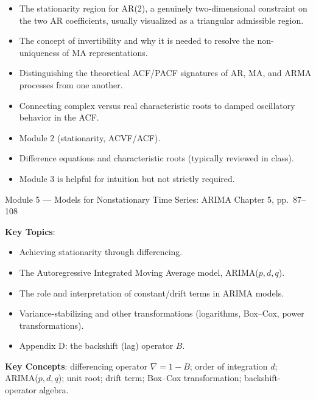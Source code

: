 \documentclass[11pt]{article}
\newcommand{\keytopics}{\textbf{\color{modblue}Key Topics}}
\newcommand{\keyconcepts}{\textbf{\color{modblue}Key Concepts}}
\begin{document}
\begin{difficult}
\begin{itemize}
  \item The stationarity region for AR(2), a genuinely two-dimensional constraint on the two AR coefficients, usually visualized as a triangular admissible region.
  \item The concept of invertibility and why it is needed to resolve the non-uniqueness of MA representations.
  \item Distinguishing the theoretical ACF/PACF signatures of AR, MA, and ARMA processes from one another.
  \item Connecting complex versus real characteristic roots to damped oscillatory behavior in the ACF.
\end{itemize}
\end{difficult}

\begin{prereqs}
\begin{itemize}
  \item Module 2 (stationarity, ACVF/ACF).
  \item Difference equations and characteristic roots (typically reviewed in class).
  \item Module 3 is helpful for intuition but not strictly required.
\end{itemize}
\end{prereqs}

\vspace{6pt}
\begin{moduletitle}{Module 5 --- Models for Nonstationary Time Series: ARIMA}
\small Chapter 5, pp.\ 87--108
\end{moduletitle}

\keytopics:
\begin{itemize}
  \item Achieving stationarity through differencing.
  \item The Autoregressive Integrated Moving Average model, ARIMA($p,d,q$).
  \item The role and interpretation of constant/drift terms in ARIMA models.
  \item Variance-stabilizing and other transformations (logarithms, Box--Cox, power transformations).
  \item Appendix D: the backshift (lag) operator $B$.
\end{itemize}

\keyconcepts: differencing operator $\nabla = 1-B$; order of integration $d$; ARIMA($p,d,q$); unit root; drift term; Box--Cox transformation; backshift-operator algebra.
\end{document}
